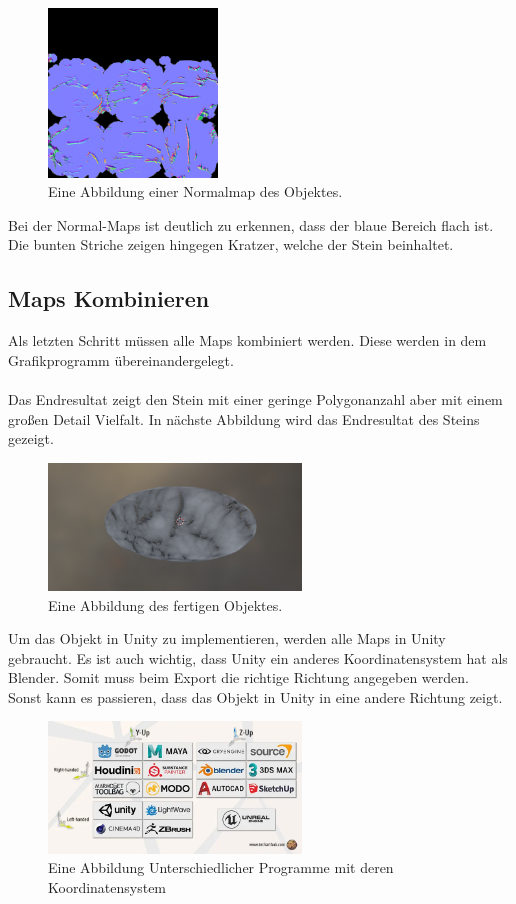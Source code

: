 \begin{figure}[H]
    \centering
    \includegraphics[width=0.4\textwidth]{chapters/11/Images/SteinNormal.png}
    \caption{Eine Abbildung einer Normalmap des Objektes.}
    \label{htl01}
\end{figure}

\noindent Bei der Normal-Maps ist deutlich zu erkennen, dass der blaue Bereich flach ist. Die bunten Striche zeigen hingegen Kratzer, welche der Stein beinhaltet.

\subsection{Maps Kombinieren}

Als letzten Schritt müssen alle Maps kombiniert werden. Diese werden in dem Grafikprogramm übereinandergelegt.\\\\
Das Endresultat zeigt den Stein mit einer geringe Polygonanzahl aber mit einem großen Detail Vielfalt. In nächste Abbildung wird das Endresultat des Steins gezeigt.

\begin{figure}[H]
    \centering
    \includegraphics[width=0.6\textwidth]{chapters/11/Images/SteinCombi.png}
    \caption{Eine Abbildung des fertigen Objektes.}
    \label{htl01}
\end{figure}

Um das Objekt in Unity zu implementieren, werden alle Maps in Unity gebraucht. Es ist auch wichtig, dass Unity ein anderes Koordinatensystem hat als Blender. Somit muss beim Export die richtige Richtung angegeben werden.  Sonst kann es passieren, dass das Objekt in Unity in eine andere Richtung zeigt.

\begin{figure}[H]
    \centering
    \includegraphics[width=0.6\textwidth]{chapters/11/Images/Koordinaten.png}
    \caption{Eine Abbildung Unterschiedlicher Programme mit deren Koordinatensystem}
    \label{htl01}
\end{figure}